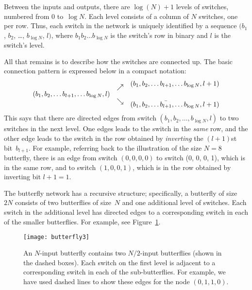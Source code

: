 Between the inputs and outputs, there are $\log(N) + 1$ levels of
switches, numbered from 0 to~$\log N$.  Each level consists of a
column of $N$ switches, one per row.  Thus, each switch in the network
is uniquely identified by a sequence $(b_1$, $b_2$, \dots, $b_{\log
  N}$, $l)$, where $b_1 b_2 \dots b_{\log N}$ is the switch's row in
binary and $l$ is the switch's level.

All that remains is to describe how the switches are connected up.
The basic connection pattern is expressed below in a compact notation:
\begin{equation*}
\begin{array}{lcr}
    &\raisebox{-5pt}{$\nearrow$}& (b_1, b_2, \dots b_{l + 1}, \dots b_{\log N}, l + 1) \\
(b_1, b_2, \dots b_{l + 1}, \dots b_{\log N}, l) &\\
    &\raisebox{5pt}{$\searrow$}& (b_1, b_2, \dots \bar{b_{l + 1}}, \dots b_{\log N}, l + 1) \\
\end{array}
\end{equation*}
This says that there are directed edges from switch $(b_1, b_2, \dots,
b_{\log N}, l)$ to two switches in the next level.  One edges leads to
the switch in the \emph{same} row, and the other edge leads to the
switch in the row obtained by \emph{inverting} the $(l + 1)$st
bit~$b_{l + 1}$.  For example, referring back to the illustration of
the size $N = 8$ butterfly, there is an edge from switch $(0, 0, 0,
0)$ to switch (0, 0, 0, 1), which is in the same row, and to switch
$(1, 0, 0, 1)$, which is in the row obtained by inverting bit $l + 1 =
1$.

The butterfly network has a recursive structure; specifically, a
butterfly of size~$2N$ consists of two butterflies of size~$N$ and one
additional level of switches.  Each switch in the additional level has
directed edges to a corresponding switch in each of the smaller
butterflies.  For example, see Figure~\ref{fig:6EP}.

\begin{figure}

\texttt{[image: butterfly3]}

\missinggraphic

\caption{An $N$-input butterfly contains two $N/2$-input butterflies
  (shown in the dashed boxes). Each switch on the first level is
  adjacent to a corresponding switch in each of the sub-butterflies.
  For example, we have used dashed lines to show these edges for the
  node $(0, 1, 1, 0)$.}

\label{fig:6EP}

\end{figure}

